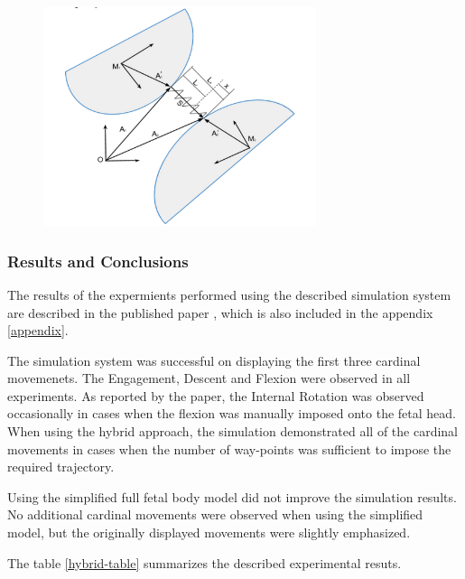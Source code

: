 \begin{figure}
  \centering
    \includegraphics[width=80mm]{sections/methodology/images/basic/mass-spring-detail.png}
  \caption[The detailed representation of a single spring attachment in the full body fetal mass-spring model. ]{\label{mass-spring-detail}}
\end{figure}

\subsubsection{Results and Conclusions}

The results of the expermients performed using the described simulation system are described in the published paper \cite{gerikhanov2013}, which is also included in the appendix \ref{appendix}.

The simulation system was successful on displaying the first three cardinal movemenets. The Engagement, Descent and Flexion were observed in all experiments. As reported by the paper, the Internal Rotation was observed occasionally in cases when the flexion was manually imposed onto the fetal head. When using the hybrid approach, the simulation demonstrated all of the cardinal movements in cases when the number of way-points was sufficient to impose the required trajectory.

Using the simplified full fetal body model did not improve the simulation results. No additional cardinal movements were observed when using the simplified model, but the originally displayed movements were slightly emphasized.

The table \ref{hybrid-table} summarizes the described experimental resuts.


